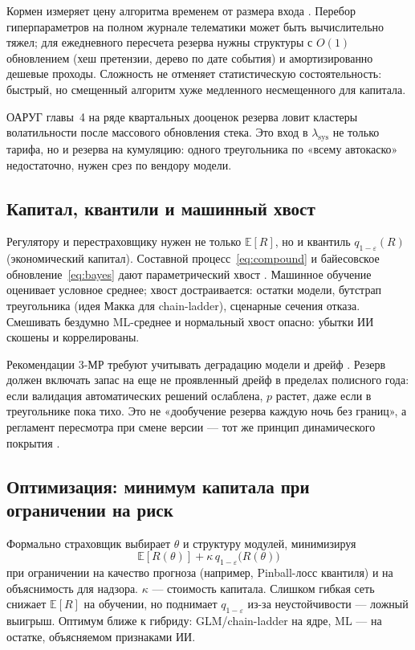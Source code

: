 \documentclass[a4paper,14pt]{extarticle}
\begin{document}
Кормен измеряет цену алгоритма временем от размера входа \cite{cormen}. Перебор гиперпараметров на полном журнале телематики может быть вычислительно тяжел; для ежедневного пересчета резерва нужны структуры с $O(1)$ обновлением (хеш претензии, дерево по дате события) и амортизированно дешевые проходы. Сложность не отменяет статистическую состоятельность: быстрый, но смещенный алгоритм хуже медленного несмещенного для капитала.

ОАРУГ главы~4 на ряде квартальных дооценок резерва ловит кластеры волатильности после массового обновления стека. Это вход в $\lambda_{\mathrm{sys}}$ не только тарифа, но и резерва на кумуляцию: одного треугольника по «всему автокаско» недостаточно, нужен срез по вендору модели.

\subsection{Капитал, квантили и машинный хвост}

Регулятору и перестраховщику нужен не только $\mathbb{E}[R]$, но и квантиль $q_{1-\varepsilon}(R)$ (экономический капитал). Составной процесс~\eqref{eq:compound} и байесовское обновление~\eqref{eq:bayes} дают параметрический хвост \cite{shvedov}. Машинное обучение оценивает условное среднее; хвост достраивается: остатки модели, бутстрап треугольника (идея Макка для chain-ladder), сценарные сечения отказа. Смешивать бездумно ML-среднее и нормальный хвост опасно: убытки ИИ скошены и коррелированы.

Рекомендации 3-МР требуют учитывать деградацию модели и дрейф \cite{cbr}. Резерв должен включать запас на еще не проявленный дрейф в пределах полисного года: если валидация автоматических решений ослаблена, $p$ растет, даже если в треугольнике пока тихо. Это не «дообучение резерва каждую ночь без границ», а регламент пересмотра при смене версии --- тот же принцип динамического покрытия \cite{zezina}.

\subsection{Оптимизация: минимум капитала при ограничении на риск}

Формально страховщик выбирает $\theta$ и структуру модулей, минимизируя
\[
\mathbb{E}[R(\theta)]+\kappa\, q_{1-\varepsilon}\bigl(R(\theta)\bigr)
\]
при ограничении на качество прогноза (например, Pinball-лосс квантиля) и на объяснимость для надзора. $\kappa$ --- стоимость капитала. Слишком гибкая сеть снижает $\mathbb{E}[R]$ на обучении, но поднимает $q_{1-\varepsilon}$ из-за неустойчивости --- ложный выигрыш. Оптимум ближе к гибриду: GLM/chain-ladder на ядре, ML --- на остатке, объясняемом признаками ИИ.
\end{document}
